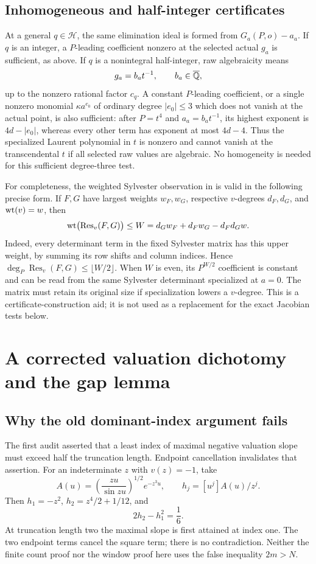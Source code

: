 \documentclass[11pt,a4paper]{article}
\theoremstyle{definition}\newtheorem{definition}[theorem]{Definition}
\theoremstyle{remark}\newtheorem{remark}[theorem]{Remark}
\begin{document}
\subsection{Inhomogeneous and half-integer certificates}
At a general $q\in\mathcal H$, the same elimination ideal is formed from $G_a(P,o)-a_a$. If $q$ is an integer, a $P$-leading coefficient nonzero at the selected actual $g_a$ is sufficient, as above. If $q$ is a nonintegral half-integer, raw algebraicity means
\[
g_a=b_a t^{-1},\qquad b_a\in\overline{\mathbb Q},
\]
up to the nonzero rational factor $c_q$. A constant $P$-leading coefficient, or a single nonzero monomial $\kappa a^{e_0}$ of ordinary degree $|e_0|\le3$ which does not vanish at the actual point, is also sufficient: after $P=t^4$ and $a_a=b_at^{-1}$, its highest exponent is $4d-|e_0|$, whereas every other term has exponent at most $4d-4$. Thus the specialized Laurent polynomial in $t$ is nonzero and cannot vanish at the transcendental $t$ if all selected raw values are algebraic. No homogeneity is needed for this sufficient degree-three test.

For completeness, the weighted Sylvester observation in \cite{Window} is valid in the following precise form. If $F,G$ have largest weights $w_F,w_G$, respective $v$-degrees $d_F,d_G$, and $\operatorname{wt}(v)=w$, then
\[
\operatorname{wt}\bigl(\operatorname{Res}_v(F,G)\bigr)\le
W=d_Gw_F+d_Fw_G-d_Fd_Gw.
\]
Indeed, every determinant term in the fixed Sylvester matrix has this upper weight, by summing its row shifts and column indices. Hence $\deg_P\operatorname{Res}_v(F,G)\le\lfloor W/2\rfloor$. When $W$ is even, its $P^{W/2}$ coefficient is constant and can be read from the same Sylvester determinant specialized at $a=0$. The matrix must retain its original size if specialization lowers a $v$-degree. This is a certificate-construction aid; it is not used as a replacement for the exact Jacobian tests below.

\section{A corrected valuation dichotomy and the gap lemma}\label{sec:val}
\subsection{Why the old dominant-index argument fails}
The first audit asserted that a least index of maximal negative valuation slope must exceed half the truncation length. Endpoint cancellation invalidates that assertion. For an indeterminate $z$ with $v(z)=-1$, take
\[
A(u)=\left(\frac{zu}{\sin zu}\right)^{1/2}e^{-z^3u},
\qquad h_j=[u^j]A(u)/z^j.
\]
Then $h_1=-z^2$, $h_2=z^4/2+1/12$, and
\[
2h_2-h_1^2=\frac16.
\]
At truncation length two the maximal slope is first attained at index one. The two endpoint terms cancel the square term; there is no contradiction. Neither the finite count proof nor the window proof here uses the false inequality $2m>N$.
\end{document}
